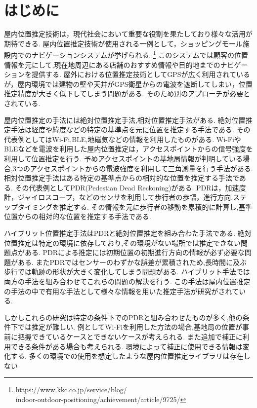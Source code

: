 \section{はじめに}
屋内位置推定技術は，現代社会において重要な役割を果たしており様々な活用が期待できる.
屋内位置推定技術が使用される一例として，ショッピングモール施設内でのナビゲーションシステムが挙げられる.
\footnote{https://www.kkc.co.jp/service/blog/\\indoor-outdoor-positioning/achievement/article/9725/}
このシステムでは顧客の位置情報を元にして,現在地周辺にある店舗のおすすめ情報や目的地までのナビゲーションを提供する.
屋外における位置推定技術としてGPSが広く利用されているが，屋内環境では建物の壁や天井がGPS衛星からの電波を遮断してしまい，位置推定精度が大きく低下してしまう問題がある.
そのため別のアプローチが必要とされている.

屋内位置推定の手法には絶対位置推定手法,相対位置推定手法がある.
絶対位置推定手法は経度や緯度などの特定の基準点を元に位置を推定する手法である.
その代表例としてはWi-Fi,BLE,地磁気などの情報を利用したものがある.
Wi-FiやBLEなどを電波を利用した屋内位置推定は，アクセスポイントからの信号強度を利用して位置推定を行う.
予めアクセスポイントの基地局情報が判明している場合,3つのアクセスポイントからの電波強度を利用して三角測量を行う手法がある.
相対位置推定手法はある特定の基準点からの相対的な位置を推定する手法である.
その代表例としてPDR(Pedestian Dead Reckoning)がある.
PDRは，加速度計，ジャイロスコープ，などのセンサを利用して歩行者の歩幅，進行方向,ステップタイミングを推定する.
その情報を元に歩行者の移動を累積的に計算し,基準位置からの相対的な位置を推定する手法である.

ハイブリット位置推定手法はPDRと絶対位置推定を組み合わた手法である.
絶対位置推定は特定の環境に依存しており,その環境がない場所では推定できない問題点がある.
PDRによる推定には初期位置の初期進行方向の情報が必ず必要な問題がある.
またPDRではセンサーのわずかな誤差が累積されため,長時間に及ぶ歩行では軌跡の形状が大きく変化してしまう問題がある.
ハイブリット手法では両方の手法を組み合わせてこれらの問題の解決を行う.
この手法は屋内位置推定の手法の中で有用な手法として様々な情報を用いた推定手法が研究がされている.

しかしこれらの研究は特定の条件下でのPDRと組み合わせたものが多く,他の条件下では推定が難しい.
例としてWi-Fiを利用した方法の場合,基地局の位置が事前に把握できているケースとできないケースが考えられる.
また追加で補正に利用できる条件がある場合も考えられる.
環境によって補正に使用できる情報は変化する.
多くの環境での使用を想定したような屋内位置推定ライブラリは存在しない

